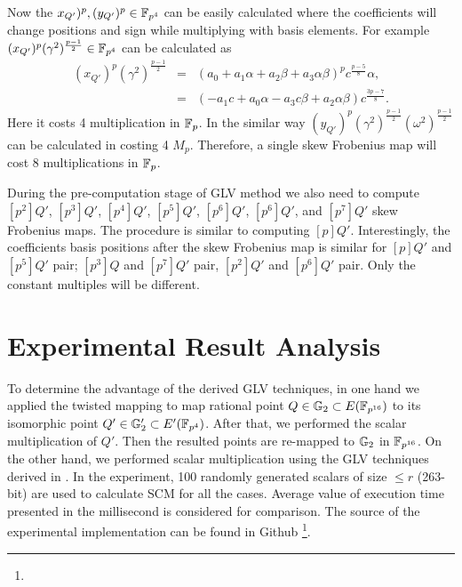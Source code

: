  Now the $x_{Q'})^p, (y_{Q'})^p \in \mathbb{F}_{p^4}$ can be easily calculated where the coefficients will change positions and sign while multiplying with basis elements. For example  $ (x_{Q'})^p (\gamma^2)^{\frac{p-1}{2}} \in \mathbb{F}_{p^4}$ can be calculated as 
\begin{eqnarray}
 (x_{Q'})^p (\gamma^2)^{\frac{p-1}{2}} &=& (a_0+a_1\alpha+a_2\beta+a_3 \alpha\beta)^p c^{\frac{p-5}{8}}\alpha, \nonumber \\
 & = & ( -a_1c + a_0 \alpha -a_3c \beta +a_2\alpha \beta) c^{\frac{3p-7}{8}}. \nonumber
\end{eqnarray} 
Here it costs 4 multiplication in ${\mathbb{F}}_{p}$.
In the similar way $(y_{Q'})^p (\gamma^2)^{\frac{p-1}{2}} (\omega^2)^{\frac{p-1}{2}}$ can be calculated in costing 4 $M_p$.
Therefore, a single skew Frobenius map will cost 8 multiplications in ${\mathbb{F}}_{p}$.

During the pre-computation stage of GLV method we also need to compute $[p^2]Q'$, $[p^3]Q'$, $[p^4]Q'$, $[p^5]Q'$, $[p^6]Q'$, $[p^6]Q'$, and $[p^7]Q'$ skew Frobenius maps. 
The procedure is similar to computing $[p]Q'$.
Interestingly, the coefficients basis positions after the skew Frobenius map is similar for $[p]Q'$ and  $[p^5]Q'$ pair; $[p^3]Q$ and $[p^7]Q'$ pair, $[p^2]Q'$ and $[p^6]Q'$ pair.
Only the constant multiples will be different.  


\section{Experimental Result Analysis}
To determine the advantage of the derived GLV techniques, in one hand we applied the twisted mapping to map rational point $Q \in {\mathbb{G}}_{2} \subset E({\mathbb{F}}_{p^{16}})$ to its isomorphic point $Q' \in {\mathbb{G}}_{2}' \subset E'({\mathbb{F}}_{p^{4}})$. 
After that, we performed the scalar multiplication of $Q'$. Then the resulted points are re-mapped to ${\mathbb{G}}_{2}$ in $\mathbb{F}_{p^{16}}$.
On the other hand, we performed scalar multiplication using the GLV techniques derived in .
In the experiment, 100 randomly generated scalars of size $\leq r$ (263-bit) are used to calculate SCM for all the cases.
Average value of execution time presented in the millisecond is considered for comparison.
The source of the experimental implementation can be found in Github \footnote{\footurl}.


